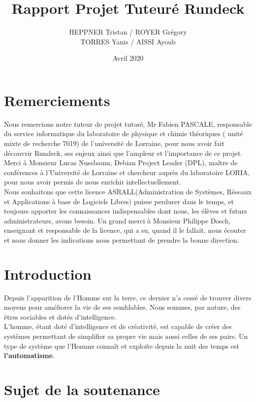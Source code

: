 \documentclass[12pt]{article}
\title{Rapport Projet Tuteuré Rundeck}
\author{HEPPNER Tristan / ROYER Grégory
\\
TORRES Yanis / AISSI Ayoub }
\date{Avril 2020}
\begin{document}
\maketitle
\newpage
\tableofcontents
\newpage

\section{Remerciements}
Nous remercions notre tuteur de projet tutoré, Mr Fabien PASCALE, responsable du service informatique du laboratoire de physique et chimie théoriques ( unité mixte de recherche 7019) de l'université de Lorraine, pour nous avoir fait découvrir Rundeck, ses enjeux ainsi que l’ampleur et l’importance de ce projet.
\vspace{0.5cm}
\\
Merci  à  Monsieur Lucas  Nussbaum,  Debian  Project  Leader  (DPL),  maître  de conférences à l'Université de Lorraine et chercheur auprès du laboratoire LORIA, pour nous avoir permis de nous enrichir intellectuellement.
\vspace{0.5cm}
\\
Nous souhaitons que cette licence ASRALL(Administration de Systèmes, Réseaux et Applications à base  de  Logiciels  Libres)  puisse  perdurer  dans  le  temps,  et  toujours  apporter  les connaissances indispensables dont nous, les élèves et futurs administrateurs, avons besoin. Un grand merci à Monsieur Philippe Dosch, enseignant et responsable de la licence, qui a su, quand il le fallait, nous écouter et nous donner les indications nous permettant de prendre la bonne direction.

\newpage

\section{Introduction}
Depuis l’apparition de l’Homme sur la terre, ce dernier n’a cessé de trouver divers moyens pour améliorer la vie de ses semblables. Nous sommes,  par  nature, des  êtres sociables et dotés d’intelligence. 
\\
L'homme, étant doté d'intelligence et de créativité, est capable de créer des systèmes permettant de simplifier sa propre vie mais aussi celles de ses pairs. Un type de système que l'Homme connaît et exploite depuis la nuit des temps est \textbf{l'automatisme}.

\section{Sujet de la soutenance}
\end{document}
